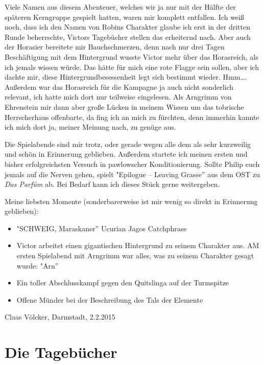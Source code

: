 Viele Namen aus diesem Abenteuer, welches wir ja nur mit der Hälfte der späteren Kerngruppe gespielt hatten, waren mir komplett entfallen. Ich weiß noch, dass ich den Namen von Robins Charakter glaube ich erst in der dritten Runde beherrschte, Victors Tagebücher stellen das erheiternd nach. Aber auch der Horasier bereitete mir Bauchschmerzen, denn nach nur drei Tagen Beschäftigung mit dem Hintergrund wusste Victor mehr über das Horasreich, als ich jemals wissen würde. Das hätte für mich eine rote Flagge sein sollen, aber ich dachte mir, diese Hintergrundbesessenheit legt sich bestimmt wieder. Hmm\dots. Außerdem war das Horasreich für die Kampagne ja auch nicht sonderlich relevant, ich hatte mich dort nur teilweise eingelesen. Als Arngrimm von Ehrenstein mir dann aber große Lücken in meinem Wissen um das tobrische Herrscherhaus offenbarte, da fing ich an mich zu fürchten, denn immerhin kannte ich mich dort ja, meiner Meinung nach, zu genüge aus.\par
Die Spielabende sind mir trotz, oder gerade wegen alle dem als sehr kurzweilig und schön in Erinnerung geblieben. Außerdem startete ich meinen ersten und bisher erfolgreichsten Versuch in pawlowscher Konditionierung. Sollte Philip euch jemals auf die Nerven gehen, spielt "Epilogue -- Leaving Grasse'' aus dem OST zu \emph{Das Parfüm} ab. Bei Bedarf kann ich dieses Stück gerne weitergeben.\par

Meine liebsten Momente (sonderbarerweise ist mir wenig so direkt in Erinnerung geblieben):\par

\begin{itemize}
\item "SCHWEIG, Maraskaner'' Ucurian Jagos Catchphrase
\item Victor arbeitet einen gigantischen Hintergrund zu seinem Charakter aus. AM ersten Spielabend mit Arngrimm war alles, was zu seinem Charakter  gesagt wurde: "Arn''
\item Ein toller Abschlusskampf gegen den Quitslinga auf der Turmspitze
\item Offene Münder bei der Beschreibung des Tals der Elemente
\end{itemize}

\begin{flushright}
Claas Völcker, Darmstadt, 2.2.2015
\end{flushright}



\section{Die Tagebücher}


